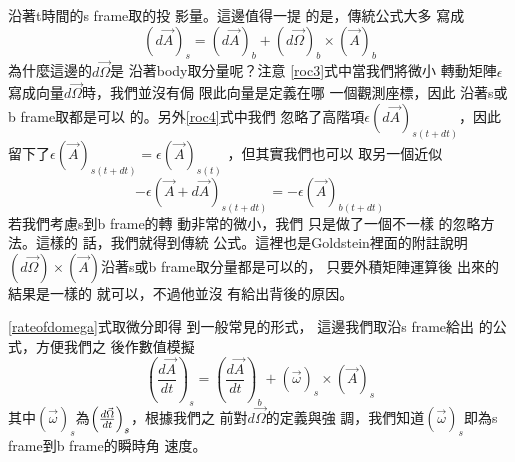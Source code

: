 \documentclass[12pt,twoside]{article}
\begin{document}
沿著t時間的s frame取的投%
影量。這邊值得一提%
的是，傳統公式大多%
寫成%
\begin{equation*}
\left( d\vec{A}\right) _{s}=\left( d\vec{A}\right) _{b}+\left( d\vec{\Omega}%
\right) _{b}\times \left( \vec{A}\right) _{b}
\end{equation*}%
為什麼這邊的$d\vec{\Omega}$是%
沿著body取分量呢？注意%
\ref{roc3}式中當我們將微小%
轉動矩陣$\epsilon $寫成向量$d%
\vec{\Omega}$時，我們並沒有侷%
限此向量是定義在哪%
一個觀測座標，因此%
沿著s或b frame取都是可以%
的。另外\ref{roc4}式中我們%
忽略了高階項$\epsilon \left( d\vec{A}%
\right) _{s(t+dt)}$，因此留下了$\epsilon
\left( \vec{A}\right) _{s(t+dt)}=\epsilon \left( \vec{A}\right) _{s(t)}$%
，但其實我們也可以%
取另一個近似%
\begin{equation*}
-\epsilon \left( \vec{A}+d\vec{A}\right) _{s(t+dt)}=-\epsilon \left( \vec{A}%
\right) _{b(t+dt)}
\end{equation*}%
若我們考慮s到b frame的轉%
動非常的微小，我們%
只是做了一個不一樣%
的忽略方法。這樣的%
話，我們就得到傳統%
公式。這裡也是Goldstein\cite%
{goldstein}裡面的附註說明$\left( d%
\vec{\Omega}\right) \times \left( \vec{A}\right) $沿著s或b
frame取分量都是可以的，%
只要外積矩陣運算後%
出來的結果是一樣的%
就可以，不過他並沒%
有給出背後的原因。

\bigskip \ref{rateofdomega}式取微分即得%
到一般常見的形式，%
這邊我們取沿s frame給出%
的公式，方便我們之%
後作數值模擬%
\begin{equation}
\left( \frac{d\vec{A}}{dt}\right) _{s}=\left( \frac{d\vec{A}}{dt}\right)
_{b}+\left( \vec{\omega}\right) _{s}\times \left( \vec{A}\right) _{s}
\label{rateofchange}
\end{equation}%
其中$\left( \vec{\omega}\right) _{s}$為$\left( \frac{d\vec{%
\Omega}}{dt}\right) _{s}$，根據我們之%
前對$d\vec{\Omega}$的定義與強%
調，我們知道$\left( \vec{\omega}\right)
_{s}$即為s frame到b frame的瞬時角%
速度。
\end{document}
